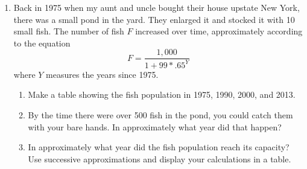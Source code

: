 \begin{enumerate}
\newpage %

\item Back in 1975 when my aunt and uncle bought their house upstate New York, there was a small pond in the yard.  They enlarged it and stocked it with 10 small fish. The number of fish $F$ increased over time, approximately according to the equation
$$ F=\frac{1,000}{1+99 \ast .65^Y}$$
where $Y$ measures the years since 1975.

\begin{enumerate}
\item Make a table showing the fish population in 1975, 1990, 2000, and 2013. \vfill
\item By the time there were over 500 fish in the pond, you could catch them with your bare hands.  In approximately what year did that happen? \vfill
\item In approximately what year did the fish population reach its capacity?  Use successive approximations and display your calculations in a table. \vfill

\end{enumerate}

%

\newpage %


\end{enumerate}

